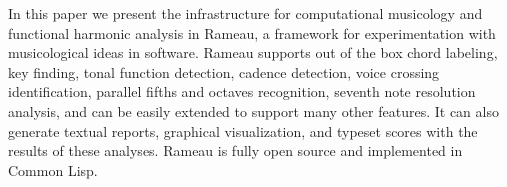 In this paper we present the infrastructure for computational
musicology and functional harmonic analysis in Rameau, a framework for
experimentation with musicological ideas in software. Rameau supports
out of the box chord labeling, key finding, tonal function detection,
cadence detection, voice crossing identification, parallel fifths and
octaves recognition, seventh note resolution analysis, and can be
easily extended to support many other features. It can also generate
textual reports, graphical visualization, and typeset scores with the
results of these analyses. Rameau is fully open source and implemented
in Common Lisp.

